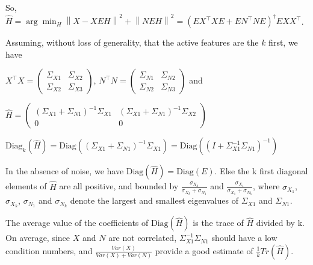 \documentclass{article}
\begin{document}
So, $\hat H = \arg \min_H  \left \| X - XEH\right\| ^2  + \left \| NEH\right \| ^2 = (E X^\top XE +EN^\top NE) ^\dagger EXX^\top$.

Assuming, without loss of generality, that the active features are the $k$ first, we have 

$X^\top X = \left(\begin{array}{lccl}\Sigma_{X1} & \Sigma_{X2} \\ \Sigma_{X2} & \Sigma_{X3}\end{array}\right)$, $N^\top N = \left(\begin{array}{lccl}\Sigma_{N1} & \Sigma_{N2} \\ \Sigma_{N2} & \Sigma_{N3}\end{array}\right)$ and 

$\hat H = \left(\begin{array}{cc}(\Sigma_{X1}+\Sigma_{N1})^{-1}\Sigma_{X1} & (\Sigma_{X1}+\Sigma_{N1})^{-1}\Sigma_{X2} \\0 & 0\end{array}\right)$

    $\text{Diag}_k (\hat H) = \text{Diag}((\Sigma_{X1}+\Sigma_{N1})^{-1}\Sigma_{X1}) = \text{Diag}((I+\Sigma_{X1}^{-1}\Sigma_{N1})^{-1})$

In the absence of noise, we have $\text{Diag}(\hat H) = \text{Diag}(E)$. Else the k first diagonal elements of $\hat H$ are all positive, and bounded by $\frac{\sigma_{X_k}}{\sigma_{X_k} +\sigma_{N_1}}$ and $\frac{\sigma_{X_1}}{\sigma_{X_1} +\sigma_{N_k}}$, where  $\sigma_{X_1}$, $\sigma_{X_k}$, $\sigma_{N_1}$ and $\sigma_{N_k}$ denote the largest and smallest eigenvalues of $\Sigma_{X1}$ and $\Sigma_{N1}$.

The average value of the coefficients of $\text{Diag}(\hat H)$ is the trace of $\hat H$ divided by k. On average, since $X$ and $N$ are not correlated, $\Sigma_{X1}^{-1}\Sigma_{N1}$ should have a low condition numbers, and $\frac{Var(X)}{Var(X)+Var(N)}$ provide a good estimate of $\frac{1}{k}Tr(\hat H)$.
\end{document}
